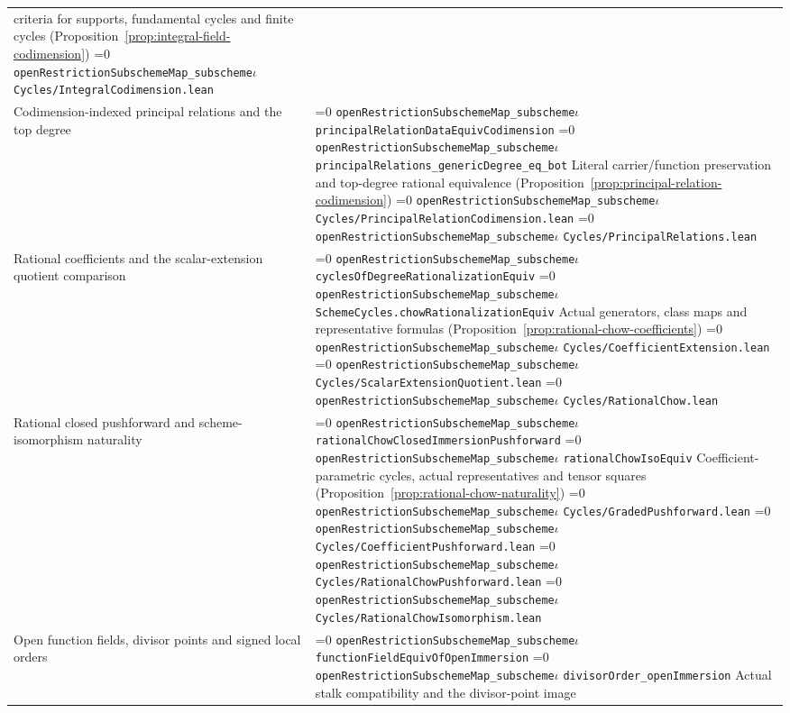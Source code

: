 \documentclass[11pt]{article}
\theoremstyle{definition}
\theoremstyle{remark}
\newcommand{\leanpath}[1]{%
  \ifnum\pdfstrcmp{\detokenize{#1}}%
      {\detokenize{openRestrictionSubschemeMap_subschemeι}}=0
    \texttt{\nolinkurl{openRestrictionSubschemeMap_subscheme}}\ensuremath{\iota}%
  \else
    \texttt{\nolinkurl{#1}}%
  \fi}
\begin{document}
\begin{longtable}{@{}>{\raggedright\arraybackslash}p{}
                >{\raggedright\arraybackslash}p{}@{}}
criteria for supports, fundamental cycles and finite cycles
(Proposition~\ref{prop:integral-field-codimension})\newline
\leanpath{Cycles/IntegralCodimension.lean}\\
Codimension-indexed principal relations and the top degree &
\leanpath{principalRelationDataEquivCodimension}\newline
\leanpath{principalRelations_genericDegree_eq_bot}\newline
Literal carrier/function preservation and top-degree rational equivalence
(Proposition~\ref{prop:principal-relation-codimension})\newline
\leanpath{Cycles/PrincipalRelationCodimension.lean}\newline
\leanpath{Cycles/PrincipalRelations.lean}\\
Rational coefficients and the scalar-extension quotient comparison &
\leanpath{cyclesOfDegreeRationalizationEquiv}\newline
\leanpath{SchemeCycles.chowRationalizationEquiv}\newline
Actual generators, class maps and representative formulas
(Proposition~\ref{prop:rational-chow-coefficients})\newline
\leanpath{Cycles/CoefficientExtension.lean}\newline
\leanpath{Cycles/ScalarExtensionQuotient.lean}\newline
\leanpath{Cycles/RationalChow.lean}\\
Rational closed pushforward and scheme-isomorphism naturality &
\leanpath{rationalChowClosedImmersionPushforward}\newline
\leanpath{rationalChowIsoEquiv}\newline
Coefficient-parametric cycles, actual representatives and tensor squares
(Proposition~\ref{prop:rational-chow-naturality})\newline
\leanpath{Cycles/GradedPushforward.lean}\newline
\leanpath{Cycles/CoefficientPushforward.lean}\newline
\leanpath{Cycles/RationalChowPushforward.lean}\newline
\leanpath{Cycles/RationalChowIsomorphism.lean}\\
Open function fields, divisor points and signed local orders &
\leanpath{functionFieldEquivOfOpenImmersion}\newline
\leanpath{divisorOrder_openImmersion}\newline
Actual stalk compatibility and the divisor-point image

\end{longtable}
\end{document}
